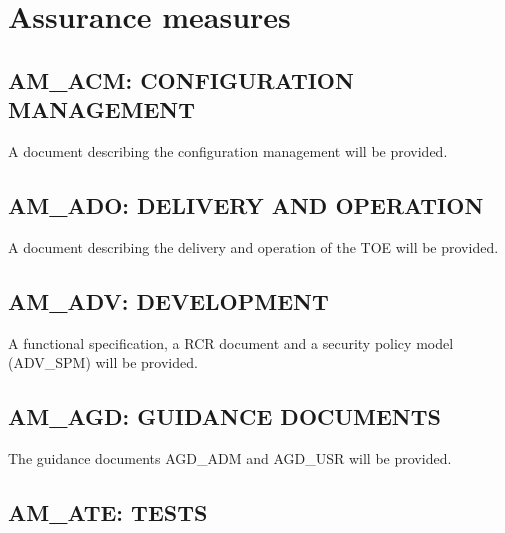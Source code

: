 \documentclass[12pt,english]{scrbook}
\begin{document}


\section{Assurance measures}





\subsection{AM{\_}ACM: CONFIGURATION MANAGEMENT}

A document describing the configuration management will be provided.





\subsection{AM{\_}ADO: DELIVERY AND OPERATION}

A document describing the delivery and operation of the TOE will be provided.




\subsection{AM{\_}ADV: DEVELOPMENT}

A functional specification,  a RCR document and a security policy model
(ADV\_SPM) will be provided.




\subsection{AM{\_}AGD: GUIDANCE DOCUMENTS}

The guidance documents AGD{\_}ADM and AGD{\_}USR will be provided.





\subsection{AM{\_}ATE: TESTS}
\end{document}
